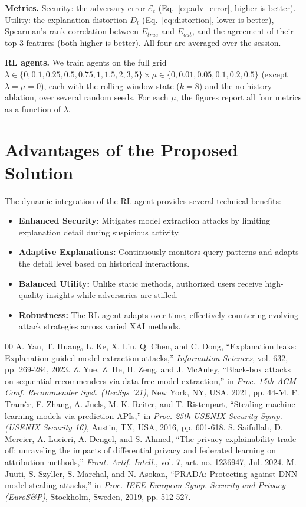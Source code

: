 \documentclass[conference]{IEEEtran}
\begin{document}
\textbf{Metrics.} Security: the adversary error $\mathcal{E}_t$ (Eq.~\ref{eq:adv_error}, higher is better). Utility: the explanation distortion $D_t$ (Eq.~\ref{eq:distortion}, lower is better), Spearman's rank correlation between $E_{true}$ and $E_{out}$, and the agreement of their top-3 features (both higher is better). All four are averaged over the session.

\textbf{RL agents.} We train agents on the full grid $\lambda\in\{0, 0.1, 0.25, 0.5, 0.75, 1, 1.5, 2, 3, 5\}\times\mu\in\{0, 0.01, 0.05, 0.1, 0.2, 0.5\}$ (except $\lambda=\mu=0$), each with the rolling-window state ($k=8$) and the no-history ablation, over several random seeds. For each $\mu$, the figures report all four metrics as a function of $\lambda$.

\section{Advantages of the Proposed Solution}
The dynamic integration of the RL agent provides several technical benefits:
\begin{itemize}
    \item \textbf{Enhanced Security:} Mitigates model extraction attacks by limiting explanation detail during suspicious activity.
    \item \textbf{Adaptive Explanations:} Continuously monitors query patterns and adapts the detail level based on historical interactions.
    \item \textbf{Balanced Utility:} Unlike static methods, authorized users receive high-quality insights while adversaries are stifled.
    \item \textbf{Robustness:} The RL agent adapts over time, effectively countering evolving attack strategies across varied XAI methods.
\end{itemize}

\begin{thebibliography}{00}
 A. Yan, T. Huang, L. Ke, X. Liu, Q. Chen, and C. Dong, ``Explanation leaks: Explanation-guided model extraction attacks,'' \textit{Information Sciences}, vol. 632, pp. 269-284, 2023.
 Z. Yue, Z. He, H. Zeng, and J. McAuley, ``Black-box attacks on sequential recommenders via data-free model extraction,'' in \textit{Proc. 15th ACM Conf. Recommender Syst. (RecSys '21)}, New York, NY, USA, 2021, pp. 44-54.
 F. Tram\`er, F. Zhang, A. Juels, M. K. Reiter, and T. Ristenpart, ``Stealing machine learning models via prediction APIs,'' in \textit{Proc. 25th USENIX Security Symp. (USENIX Security 16)}, Austin, TX, USA, 2016, pp. 601-618.
 S. Saifullah, D. Mercier, A. Lucieri, A. Dengel, and S. Ahmed, ``The privacy-explainability trade-off: unraveling the impacts of differential privacy and federated learning on attribution methods,'' \textit{Front. Artif. Intell.}, vol. 7, art. no. 1236947, Jul. 2024.
 M. Juuti, S. Szyller, S. Marchal, and N. Asokan, ``PRADA: Protecting against DNN model stealing attacks,'' in \textit{Proc. IEEE European Symp. Security and Privacy (EuroS\&P)}, Stockholm, Sweden, 2019, pp. 512-527.
\end{thebibliography}
\end{document}
